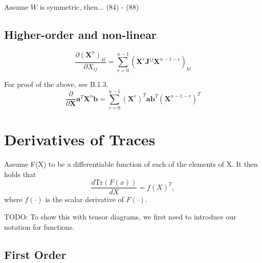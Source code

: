 \documentclass[oneside]{book}
\begin{document}
Assume $W$ is symmetric, then... (84) - (88)

\subsection{Higher-order and non-linear}


$$
\frac{\partial\left(\mathbf{X}^n\right)_{k l}}{\partial X_{i j}}=\sum_{r=0}^{n-1}\left(\mathbf{X}^r \mathbf{J}^{i j} \mathbf{X}^{n-1-r}\right)_{k l}
$$

For proof of the above, see B.1.3.
$$
\frac{\partial}{\partial \mathbf{X}} \mathbf{a}^T \mathbf{X}^n \mathbf{b}=\sum_{r=0}^{n-1}\left(\mathbf{X}^r\right)^T \mathbf{a b}^T\left(\mathbf{X}^{n-1-r}\right)^T
$$

\section{Derivatives of Traces}
Assume F(X) to be a differentiable function of each of the elements of X. It
then holds that
\[\frac{d \mathrm{Tr}(F(x))}{dX} = f(X)^T,\]
where $f(\cdot)$ is the scalar derivative of $F(\cdot)$.

TODO: To show this with tensor diagrams, we first need to introduce our notation for functions.


\subsection{First Order}
\end{document}
